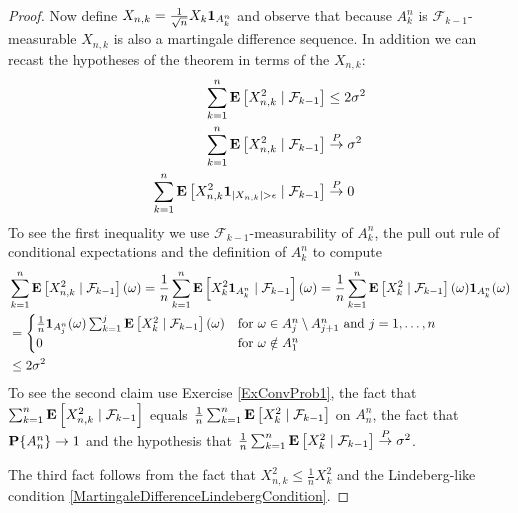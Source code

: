 \begin{proof}
Now define $X_{n,k} = \frac{1}{\sqrt{n}} X_k \characteristic{A_k^n}$
and observe that because $A^n_k$ is $\mathcal{F}_{k-1}$-measurable
$X_{n,k}$ is also a martingale difference sequence.  In addition we
can recast the hypotheses of the theorem in terms of the $X_{n,k}$:
\begin{align*}
\sum_{k=1}^n \cexpectationlong{\mathcal{F}_{k-1}}{X_{n,k}^2} 
&\leq 2\sigma^2 \\
\sum_{k=1}^n \cexpectationlong{\mathcal{F}_{k-1}}{X_{n,k}^2} 
&\toprob \sigma^2 \\
\sum_{k=1}^n  \cexpectationlong{\mathcal{F}_{k-1}}{X^2_{n,k}
  \characteristic{\abs{X_{n,k}} > \epsilon}} 
&\toprob 0
\end{align*}
To see the first inequality we use $\mathcal{F}_{k-1}$-measurability of $A^n_k$, the pull 
out rule of conditional expectations and the definition of $A^n_k$ to compute
\begin{align*}
&\sum_{k=1}^n \cexpectationlong{\mathcal{F}_{k-1}}{X_{n,k}^2} (\omega) =
\frac{1}{n} \sum_{k=1}^n \cexpectationlong{\mathcal{F}_{k-1}}{X_{k}^2
                                                               \characteristic{A^n_k}}
                                                                        (\omega)
=
\frac{1}{n} \sum_{k=1}^n \cexpectationlong{\mathcal{F}_{k-1}}{X_{k}^2
                                                               }(\omega)\characteristic{A^n_k}(\omega)
  \\
&= \begin{cases}
\frac{1}{n} 
\characteristic{A^n_j}(\omega)
\sum_{k=1}^j
\cexpectationlong{\mathcal{F}_{k-1}}{X_{k}^2}(\omega)
& \text{for $\omega \in A^n_j \setminus A^n_{j+1}$ and $j=1, \dotsc, n$} \\                                                               
0 & \text{for $\omega \notin A^n_1$}
\end{cases} \\
&\leq 2\sigma^2
\end{align*}
To see the second claim use Exercise \ref{ExConvProb1}, the fact that 
$\sum_{k=1}^n \cexpectationlong{\mathcal{F}_{k-1}}{X_{n,k}^2}$ equals 
$\frac{1}{n}\sum_{k=1}^n \cexpectationlong{\mathcal{F}_{k-1}}{X_{k}^2}$ on $A^n_n$, the fact that
$\probability{A^n_n} \to 1$ and the hypothesis that 
$\frac{1}{n}\sum_{k=1}^n \cexpectationlong{\mathcal{F}_{k-1}}{X_{k}^2} \toprob \sigma^2$.

The third fact follows from the fact that $X_{n,k}^2 \leq
\frac{1}{n}X_k^2$ and the Lindeberg-like condition \eqref{MartingaleDifferenceLindebergCondition}.


\end{proof}
